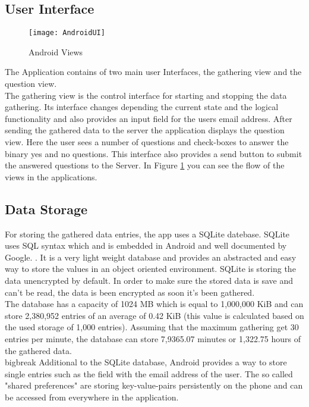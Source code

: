 \subsection{User Interface}

\begin{figure}
\texttt{[image: AndroidUI]}
\caption{Android Views}\label{aviews}
\vspace{10 mm}
\end{figure}

The Application contains of two main user Interfaces, the gathering view and the question view.\\
The gathering view is the control interface for starting and stopping the data gathering. Its interface changes depending the current state and the logical functionality and also provides an input field for the users email address.
\bigbreak
After sending the gathered data to the server the application displays the question view. Here the user sees a number of questions and check-boxes to answer the binary yes and no questions. 
This interface also provides a send button to submit the answered questions to the Server.
\bigbreak
In Figure \ref{aviews} you can see the flow of the views in the applications.

\subsection{Data Storage}
For storing the gathered data entries, the app uses a SQLite datebase. SQLite uses SQL syntax which and is embedded in Android and well documented by Google. \cite{vogel2010android}. It is a very light weight database and provides an abstracted and easy way to store the values in an object oriented environment. SQLite is storing the data unencrypted by default. In order to make sure the stored data is save and can't be read, the data is been encrypted as soon it's been gathered.\\
The database has a capacity of 1024 MB which is equal to 1,000,000 KiB and can store 2,380,952 entries of an average of 0.42 KiB (this value is calculated based on the used storage of 1,000 entries). Assuming that the maximum gathering get 30 entries per minute, the database can store 7,9365.07 minutes or 1,322.75 hours of the gathered data. 
\\bigbreak
Additional to the SQLite database, Android provides a way to store single entries such as the field with the email address of the user. The so called "shared preferences" are storing key-value-pairs persistently on the phone and can be accessed from everywhere in the application.

